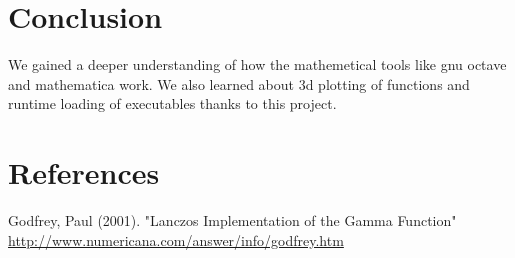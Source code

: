 \documentclass[12pt]{article}
\begin{document}
\section{Conclusion}

We gained a deeper understanding of how the mathemetical tools like gnu octave and mathematica work.
We also learned about 3d plotting of functions and runtime loading of executables thanks to this project.

\section{References}
\begin{thebibliography}{2}
	 Godfrey, Paul (2001). "Lanczos Implementation of the Gamma Function" \url{http://www.numericana.com/answer/info/godfrey.htm}
\end{thebibliography}
\end{document}
